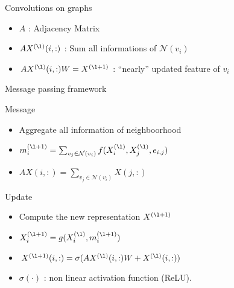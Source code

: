 \documentclass[11pt]{beamer}
\begin{document}
\begin{frame}{Convolutions on graphs}
      \begin{itemize}
      \item $A$ : Adjacency Matrix
      \item $AX^{(\l)}(i,:)$ : Sum all informations of $\mathcal{N}(v_i)$
      \item $AX^{(\l)}(i,:)W = X^{(\l+1)}$ : ``nearly'' updated feature of $v_i$
      \end{itemize}
      \vfill
\end{frame}

\begin{frame}{Message passing framework }
  \begin{block}{Message}
    \begin{itemize}
    \item Aggregate all information of neighboorhood%
    \item $m_i^{(\l+1)} = \sum_{v_j \in \mathcal{N}(v_i)}
      f(X^{(\l)}_i,X^{(\l)}_j,e_{i,j})$

    \item $AX(i,:) = \sum_{v_j \in \mathcal{N}(v_i)} X(j,:)$
    \end{itemize}
  \end{block}
  \begin{block}{Update}
    \begin{itemize}
    \item Compute the new representation $X^{(\l+1)}$
    \item $X_i^{(\l+1)} = g(X_i^{(\l)}, m_i^{(\l+1)})$
    \item $X^{(\l+1)} (i,:) = \sigma(AX^{(\l)} (i,:)W + X^{(\l)} (i,:))$
    \item $\sigma(\cdot)$ : non linear activation function (ReLU).
    \end{itemize}
  \end{block}
\end{frame}
\end{document}
